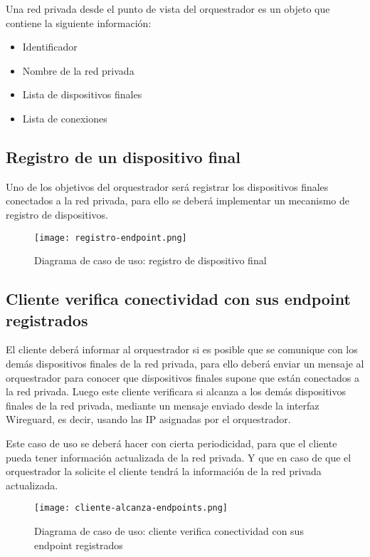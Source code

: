 Una red privada desde el punto de vista del orquestrador es un objeto que contiene la siguiente información:
\begin{itemize}
    \item Identificador
    \item Nombre de la red privada
    \item Lista de dispositivos finales
    \item Lista de conexiones
\end{itemize}

\subsection{Registro de un dispositivo final}
Uno de los objetivos del orquestrador será registrar los dispositivos finales conectados a la red privada, para ello se deberá implementar un mecanismo de registro de dispositivos.

\begin{figure}[h!]
    \centering
    \texttt{[image: registro-endpoint.png]}
    \caption{Diagrama de caso de uso: registro de dispositivo final}
\end{figure}


\subsection{Cliente verifica conectividad con sus endpoint registrados}
El cliente deberá informar al orquestrador si es posible que se comunique con los demás dispositivos finales de la red privada, para ello deberá enviar un mensaje al orquestrador para conocer que dispositivos finales supone que están conectados a la red privada.
Luego este cliente verificara si alcanza a los demás dispositivos finales de la red privada, mediante un mensaje enviado desde la interfaz Wireguard, es decir, usando las IP asignadas por el orquestrador.

Este caso de uso se deberá hacer con cierta periodicidad, para que el cliente pueda tener información actualizada de la red privada. Y que en caso de que el orquestrador la solicite el cliente tendrá la información de la red privada actualizada.

\begin{figure}[h!]
    \centering
    \texttt{[image: cliente-alcanza-endpoints.png]}
    \caption{Diagrama de caso de uso: cliente verifica conectividad con sus endpoint registrados}
\end{figure}


